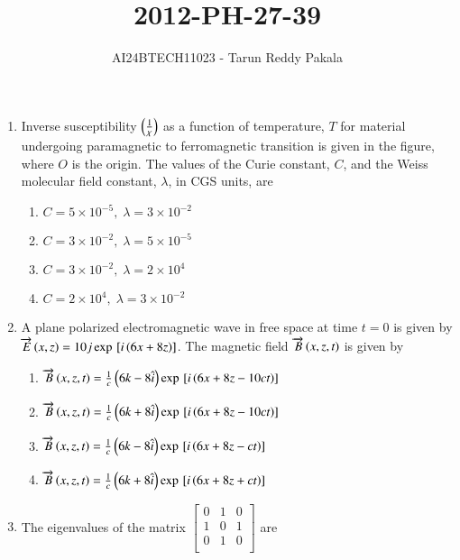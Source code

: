 \documentclass[journal,12pt,onecolumn]{IEEEtran}
\title{2012-PH-27-39}
\author{AI24BTECH11023 - Tarun Reddy Pakala}
\theoremstyle{remark}
\begin{document}


\maketitle
\bigskip
\renewcommand{\thefigure}{\theenumi}
\renewcommand{\thetable}{\theenumi}
\begin{enumerate}[start=27]
\item Inverse susceptibility $\left(\frac{1}{\chi}\right)$ as a function of temperature, $T$ for material undergoing paramagnetic to ferromagnetic transition is given in the figure, where $O$ is the origin. The values of the Curie constant, $C$, and the Weiss molecular field constant, $\lambda$, in CGS units, are
	

\begin{enumerate}
    \item $C=5\times 10^{-5}, \; \lambda=3\times 10^{-2}$
    \item $C=3\times 10^{-2}, \; \lambda=5\times 10^{-5}$
    \item $C=3\times 10^{-2}, \; \lambda=2\times 10^{4}$
    \item $C=2\times 10^{4}, \; \lambda=3\times 10^{-2}$
\end{enumerate}
\item A plane polarized electromagnetic wave in free space at time $t=0$ is given by $\overrightarrow{E}\left(x, z\right)=10j\exp{\ensuremath{{}\left[i\left(6x+8z\right)\right]}}$. The magnetic field $\overrightarrow{B}\left(x, z, t\right)$ is given by
\begin{enumerate}
    \item $\overrightarrow{B}\left(x, z, t\right)=\frac{1}{c}\left(6k-8\hat{i}\right)\exp{\ensuremath{{}\left[i\left(6x+8z-10ct\right)\right]}}$
    \item $\overrightarrow{B}\left(x, z, t\right)=\frac{1}{c}\left(6k+8\hat{i}\right)\exp{\ensuremath{{}\left[i\left(6x+8z-10ct\right)\right]}}$
    \item $\overrightarrow{B}\left(x, z, t\right)=\frac{1}{c}\left(6k-8\hat{i}\right)\exp{\ensuremath{{}\left[i\left(6x+8z-ct\right)\right]}}$
    \item $\overrightarrow{B}\left(x, z, t\right)=\frac{1}{c}\left(6k+8\hat{i}\right)\exp{\ensuremath{{}\left[i\left(6x+8z+ct\right)\right]}}$
\end{enumerate}
\item The eigenvalues of the matrix $\begin{bmatrix}
0 & 1 & 0 \\
1 & 0 & 1 \\
0 & 1 & 0 \\
\end{bmatrix}$ are

\end{enumerate}
\end{document}
